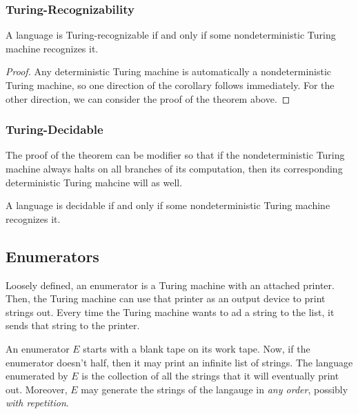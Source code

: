 \documentclass[letterpaper]{article}
\begin{document}
\subsubsection{Turing-Recognizability}
\begin{corollary}{}{}
    A language is Turing-recognizable if and only if some nondeterministic Turing machine recognizes it. 
\end{corollary}

\begin{mdframed}[]
    \begin{proof}
        Any deterministic Turing machine is automatically a nondeterministic Turing machine, so one direction of the corollary follows immediately. For the other direction, we can consider the proof of the theorem above. 
    \end{proof}
\end{mdframed}

\subsubsection{Turing-Decidable}
The proof of the theorem can be modifier so that if the nondeterministic Turing machine always halts on all branches of its computation, then its corresponding deterministic Turing mahcine will as well. 
\begin{corollary}{}{}
    A language is decidable if and only if some nondeterministic Turing machine recognizes it. 
\end{corollary}


\subsection{Enumerators}
Loosely defined, an enumerator is a Turing machine with an attached printer. Then, the Turing machine can use that printer as an output device to print strings out. Every time the Turing machine wants to ad a string to the list, it sends that string to the printer. 

\bigskip 

An enumerator $E$ starts with a blank tape on its work tape. Now, if the enumerator doesn't half, then it may print an infinite list of strings. The language enumerated by $E$ is the collection of all the strings that it will eventually print out. Moreover, $E$ may generate the strings of the langauge in \emph{any order}, possibly \emph{with repetition}.

\bigskip 
\end{document}
